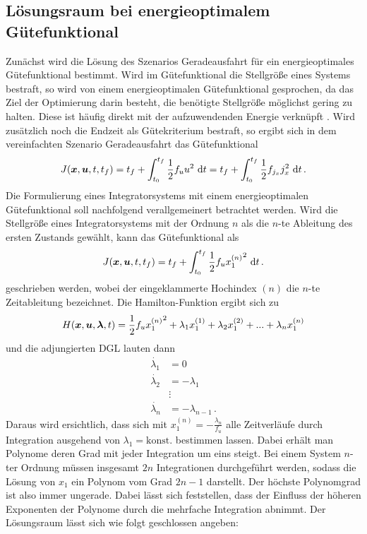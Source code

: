\subsection{Lösungsraum bei energieoptimalem Gütefunktional}\label{subsec:Lösungsraum_Geradeausfahrt}
Zunächst wird die Lösung des Szenarios Geradeausfahrt für ein energieoptimales Gütefunktional bestimmt. Wird im Gütefunktional die Stellgröße eines Systems bestraft, so wird von einem energieoptimalen Gütefunktional gesprochen, da das Ziel der Optimierung darin besteht, die benötigte Stellgröße möglichst gering zu halten. Diese ist häufig direkt mit der aufzuwendenden Energie verknüpft \cite{KnutGraichen.2012}. Wird zusätzlich noch die Endzeit als Gütekriterium bestraft, so ergibt sich in dem vereinfachten Szenario Geradeausfahrt das Gütefunktional
\begin{equation}
	J(\boldsymbol{x},\boldsymbol{u},t,t_f) = t_f + \int_{t_0}^{t_f}\frac{1}{2}f_uu^2~\textrm{d}{t} = t_f + \int_{t_0}^{t_f}\frac{1}{2}f_{j_x} j_x^2~\textrm{d}{t}\,.
\end{equation}
Die Formulierung eines Integratorsystems mit einem energieoptimalen Gütefunktional soll nachfolgend verallgemeinert betrachtet werden. Wird die Stellgröße eines Integratorsystems mit der Ordnung $n$ als die $n$-te Ableitung des ersten Zustands gewählt, kann das Gütefunktional als 
\begin{equation}
J(\boldsymbol{x},\boldsymbol{u},t,t_f) = t_f + \int_{t_0}^{t_f}\frac{1}{2}f_u{x_1^{(n)}}^2~\textrm{d}{t}\,.
\end{equation}
geschrieben werden, wobei der eingeklammerte Hochindex $(n)$ die $n$-te Zeitableitung bezeichnet. Die Hamilton-Funktion ergibt sich zu
\begin{equation}
H(\boldsymbol{x},\boldsymbol{u},\boldsymbol{\lambda},t) = \frac{1}{2}f_u{x_1^{(n)}}^2 + \lambda_1x_1^{(1)} + \lambda_2x_1^{(2)} + ... + \lambda_nx_1^{(n)}
\end{equation}
und die adjungierten \gls{DGL} lauten dann  
\begin{align}
	\dot{\lambda_1} &= 0 \\
	\dot{\lambda_2} &= -\lambda_1 \\
	&\vdots \\
	\dot{\lambda_n} &= -\lambda_{n-1}\,.
\end{align}
Daraus wird ersichtlich, dass sich mit $x_1^{(n)} = -\frac{\lambda_n}{f_u}$ alle Zeitverläufe durch Integration ausgehend von $\lambda_1 = \textrm{konst.}$ bestimmen lassen. Dabei erhält man Polynome deren Grad mit jeder Integration um eins steigt. Bei einem System $n$-ter Ordnung müssen insgesamt $2n$ Integrationen durchgeführt werden, sodass die Lösung von $x_1$ ein Polynom vom Grad $2n-1$ darstellt. Der höchste Polynomgrad ist also immer ungerade. Dabei lässt sich feststellen, dass der Einfluss der höheren Exponenten der Polynome durch die mehrfache Integration abnimmt. Der Lösungsraum lässt sich wie folgt geschlossen angeben: 
